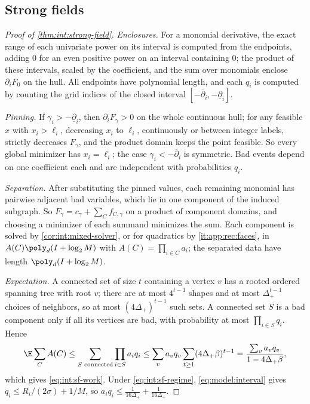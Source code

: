 \subsection{Strong fields}\label{app:int:strong-field}

\begin{proof}[Proof of \cref{thm:int:strong-field}]
\emph{Enclosures.} For a monomial derivative, the exact range of each univariate power
on its interval is computed from the endpoints, adding $0$ for an even positive power
on an interval containing $0$; the product of these intervals, scaled by the
coefficient, and the sum over monomials enclose $\partial_iF_0$ on the hull. All
endpoints have polynomial length, and each $q_i$ is computed by counting the grid
indices of the closed interval $[-\overline\partial_i,-\underline\partial_i]$.

\emph{Pinning.} If $\gamma_i>-\underline\partial_i$, then $\partial_iF_\gamma>0$ on the
whole continuous hull; for any feasible $x$ with $x_i>\ell_i$, decreasing $x_i$ to
$\ell_i$, continuously or between integer labels, strictly decreases $F_\gamma$, and the
product domain keeps the point feasible. So every global minimizer has $x_i=\ell_i$; the
case $\gamma_i<-\overline\partial_i$ is symmetric. Bad events depend on one coefficient each
and are independent with probabilities $q_i$.

\emph{Separation.} After substituting the pinned values, each remaining monomial has
pairwise adjacent bad variables, which lie in one component of the induced subgraph.
So $F_\gamma=c_\gamma+\sum_Cf_{C,\gamma}$ on a product of component domains, and choosing
a minimizer of each summand minimizes the sum. Each component is solved by
\cref{cor:int:mixed-solver}, or for quadratics by \ref{it:app:rec:faces}, in
$A(C)\poly_d(I+\log_2M)$ with $A(C)=\prod_{i\in C}a_i$; the separated data have length
$\poly_d(I+\log_2M)$.

\emph{Expectation.} A connected set of size $t$ containing a vertex $v$ has a rooted
ordered spanning tree with root $v$; there are at most $4^{t-1}$ shapes and at most
$\Delta_+^{t-1}$ choices of neighbors, so at most $(4\Delta_+)^{t-1}$ such sets. A
connected set $S$ is a bad component only if all its vertices are bad, with probability
at most $\prod_{i\in S}q_i$. Hence
\[
 \E\sum_{C}A(C)\le\sum_{S\text{ connected}}\prod_{i\in S}a_iq_i
 \le\sum_va_vq_v\sum_{t\ge1}(4\Delta_+\beta)^{t-1}=\frac{\sum_va_vq_v}{1-4\Delta_+\beta},
\]
which gives \eqref{eq:int:sf-work}. Under \eqref{eq:int:sf-regime},
\eqref{eq:model:interval} gives $q_i\le R_i/(2\sigma)+1/M$, so
$a_iq_i\le\frac1{16\Delta_+}+\frac1{16\Delta_+}$.


\end{proof}
